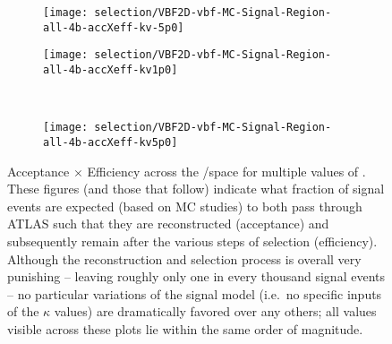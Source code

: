         \begin{figure}[tbh]
            \begin{subfigure}{0.48\textwidth}
                \texttt{[image: selection/VBF2D-vbf-MC-Signal-Region-all-4b-accXeff-kv-5p0]}
                \caption{}
            \end{subfigure}
            \begin{subfigure}{0.48\textwidth}
                \texttt{[image: selection/VBF2D-vbf-MC-Signal-Region-all-4b-accXeff-kv1p0]}
                \caption{}
            \end{subfigure}\\
            \begin{subfigure}{0.48\textwidth}
                \texttt{[image: selection/VBF2D-vbf-MC-Signal-Region-all-4b-accXeff-kv5p0]}
                \caption{}
            \end{subfigure}
            \caption{
                Acceptance $\times$ Efficiency across the \kvv/\kl space for multiple values of \kv.
                These figures (and those that follow) indicate what fraction of signal events are expected (based on MC studies)
                    to both pass through ATLAS such that they are reconstructed (acceptance)
                    and subsequently remain after the various steps of selection (efficiency).
                Although the reconstruction and selection process is overall very punishing -- 
                    leaving roughly only one in every thousand signal events --
                    no particular variations of the signal model (i.e.\ no specific inputs of the $\kappa$ values)
                    are dramatically favored over any others;
                    all values visible across these plots lie within the same order of magnitude.
            }
            \label{fig:accXeff_kv}
        \end{figure}

